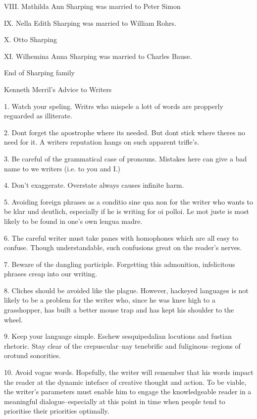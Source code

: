 \documentclass[a4paper]{article}
\begin{document}
VIII. Mathilda Ann Sharping was married to Peter Simon

IX. Nella Edith Sharping was married to William Rohrs.

X. Otto Sharping

XI.  Wilhemina Anna Sharping was married to Charles Bause.

\vskip 4mm
End of Sharping family
\pagebreak

{\Huge \noindent Kenneth Merril's Advice to Writers}
\vskip 5mm


1. Watch your speling.  Writrs who mispele a lott of words are propperly reguarded as illiterate.

2. Dont forget the apostrophe where its needed.  But dont stick where theres no need for it. A writers reputation hangs on such apparent trifle's.  

3. Be careful of the grammatical case of pronouns.  Mistakes here can give a bad name to we writers (i.e. to you and I.)

4. Don't exaggerate.  Overstate always causes infinite harm.

5. Avoiding foreign phrases as a conditio sine qua non for the writer who wants to be klar und deutlich, especially if he is writing for oi polloi.  Le mot juste is most likely to be found in one's own lengua madre.  

6. The careful writer must take panes with homophones which are all easy to confuse.  Though understandable, such confusions great on the reader's nerves.

7. Beware of the dangling participle.  Forgetting this admonition, infelicitous phrases creap into our writing.

8.  Cliches should be avoided like the plague.  However, hackeyed languages is not likely to be a problem for the writer who, since he was knee high to a grasshopper, has built a better mouse trap and has kept his shoulder to the wheel.

9.  Keep your language simple.  Eschew sesquipedalian locutions and fustian rhetoric.  Stay clear of the crepuscular--nay tenebrific and fuliginous--regions of orotund sonorities.

10.  Avoid vogue words.  Hopefully, the writer will remember that his words impact the reader at the dynamic inteface of creative thought and action.  To be viable, the writer's parameters must enable him to engage the knowledgeable reader in a meaningful dialogue--especially at this point in time when people tend to prioritise their priorities optimally.
\end{document}
